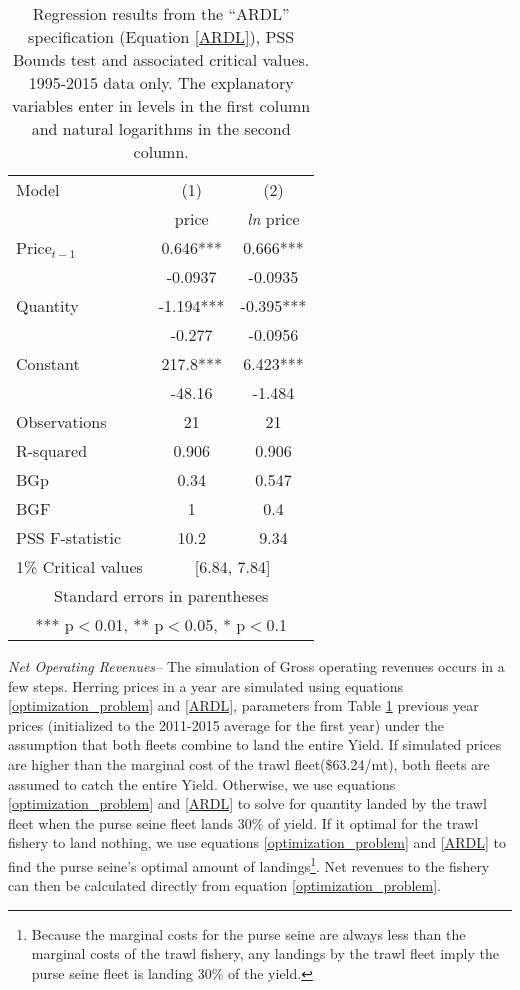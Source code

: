 \documentclass[]{article}
\let\rmarkdownfootnote\footnote%
\def\footnote{\protect\rmarkdownfootnote}
\begin{document}
\begin{table}[htbp]
\begin{center}
\begin{tabular}{lcc} \hline
Model       &   (1) &   (2)     \\
    &   price & \textit{ln} price   \\\hline
Price$_{t-1}$       &   0.646***    &   0.666***    \\
        &   -0.0937 &   -0.0935 \\
Quantity        &   -1.194***   &   -0.395***   \\
        &   -0.277  &   -0.0956 \\
Constant        &   217.8***    &   6.423***    \\
        &   -48.16  &   -1.484  \\
Observations        &   21  &   21  \\
R-squared       &   0.906   &   0.906   \\
BGp     &   0.34    &   0.547   \\
BGF     &   1   &   0.4 \\
PSS F-statistic &   10.2    &   9.34    \\\hline
1\% Critical values &\multicolumn{2}{c}{[6.84, 7.84]} \\\hline
\multicolumn{3}{c}{ Standard errors in parentheses} \\
\multicolumn{3}{c}{ *** p$<$0.01, ** p$<$0.05, * p$<$0.1} \\\hline
\end{tabular}
\caption{Regression results from the ``ARDL'' specification (Equation \ref{ARDL}), PSS Bounds test and associated critical values.  1995-2015 data only. The explanatory variables enter in levels in the first column and natural logarithms in the second column.  \label{ardl_regression}}
\end{center}
\end{table}

\emph{Net Operating Revenues--} The simulation of Gross operating
revenues occurs in a few steps. Herring prices in a year are simulated
using equations \ref{optimization_problem} and \ref{ARDL}, parameters
from Table \ref{ardl_regression} previous year prices (initialized to
the 2011-2015 average for the first year) under the assumption that both
fleets combine to land the entire Yield. If simulated prices are higher
than the marginal cost of the trawl fleet(\$63.24/mt), both fleets are
assumed to catch the entire Yield. Otherwise, we use equations
\ref{optimization_problem} and \ref{ARDL} to solve for quantity landed
by the trawl fleet when the purse seine fleet lands 30\% of yield. If it
optimal for the trawl fishery to land nothing, we use equations
\ref{optimization_problem} and \ref{ARDL} to find the purse seine's
optimal amount of landings\footnote{Because the marginal costs for the
  purse seine are always less than the marginal costs of the trawl
  fishery, any landings by the trawl fleet imply the purse seine fleet
  is landing 30\% of the yield.}. Net revenues to the fishery can then
be calculated directly from equation \ref{optimization_problem}.
\end{document}
